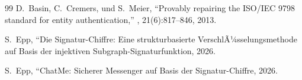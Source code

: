 ﻿\documentclass[12pt, a4paper]{article}
\theoremstyle{plain}
\theoremstyle{definition}
\theoremstyle{remark}
\begin{document}
\begin{thebibliography}{99}
D.~Basin, C.~Cremers, und S.~Meier,
\newblock ``Provably repairing the ISO/IEC 9798 standard for entity authentication,''
, 21(6):817--846, 2013.

S.~Epp,
\newblock ``Die Signatur-Chiffre: Eine strukturbasierte VerschlÃ¼sselungsmethode auf Basis der injektiven Subgraph-Signaturfunktion, 2026.

S.~Epp,
\newblock ``ChatMe: Sicherer Messenger auf Basis der Signatur-Chiffre, 2026.

\end{thebibliography}
\end{document}
